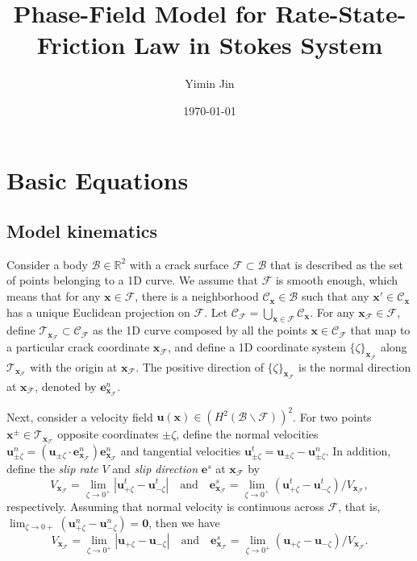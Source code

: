 \documentclass{article}
\begin{document}
  \title{Phase-Field Model for Rate-State-Friction Law in Stokes System}
  \author{Yimin Jin}
  \date{\small\today}
  \maketitle

\section{Basic Equations}\label{sect:basic equations}

\subsection{Model kinematics}\label{sect:kinematics}

Consider a body $\mathcal B\in\mathbb R^2$ with a crack surface $\mathcal F\subset\mathcal B$ that is described as the set of points belonging to a 1D curve. We assume that $\mathcal F$ is smooth enough, which means that for any $\bm x\in\mathcal F$, there is a neighborhood $\mathcal C_{\bm x}\in\mathcal B$ such that any $\bm x'\in\mathcal C_{\bm x}$ has a unique Euclidean projection on $\mathcal F$. Let $\mathcal C_{\mathcal F} = \bigcup_{\bm x\in\mathcal F}\mathcal C_{\bm x}$. For any $\bm x_{\mathcal F}\in\mathcal F$, define $\mathcal T_{\bm x_\mathcal F}\subset\mathcal C_{\mathcal F}$ as the 1D curve composed by all the points $\bm x\in\mathcal C_{\mathcal F}$ that map to a particular crack coordinate $\bm x_\mathcal F$, and define a 1D coordinate system $\{\zeta\}_{\bm x_\mathcal F}$ along $\mathcal T_{\bm x_\mathcal F}$ with the origin at $\bm x_\mathcal F$. The positive direction of $\{\zeta\}_{\bm x_\mathcal F}$ is the normal direction at $\bm x_\mathcal F$, denoted by $\bm e^n_{\bm x_\mathcal F}$.

Next, consider a velocity field ${\bm u}(\bm x)\in\left(H^2(\mathcal B\backslash\mathcal F)\right)^2$. For two points $\bm x^\pm\in\mathcal T_{\bm x_\mathcal F}$ opposite coordinates $\pm\zeta$, define the normal velocities ${\bm u}_{\pm\zeta}^n = ({\bm u}_{\pm\zeta}\cdot\bm e^n_{\bm x_\mathcal F})\bm e^n_{\bm x_\mathcal F}$ and tangential velocities ${\bm u}_{\pm\zeta}^t = {\bm u}_{\pm\zeta} - {\bm u}_{\pm\zeta}^n$. In addition, define the \textit{slip rate} $V$ and \textit{slip direction} $\bm e^s$ at $\bm x_\mathcal F$ by
\begin{equation}
  V_{\bm x_\mathcal F} = \lim_{\zeta\to 0^+}\left|{\bm u}_{+\zeta}^t - {\bm u}_{-\zeta}^t\right|\quad\text{and}\quad
  \bm e^s_{\bm x_\mathcal F} = \lim_{\zeta\to 0^+}\left({\bm u}_{+\zeta}^t - {\bm u}_{-\zeta}^t\right)/V_{\bm x_\mathcal F},
\end{equation}
respectively. Assuming that normal velocity is continuous across $\mathcal F$, that is, $\displaystyle\lim_{\zeta\to 0+}({\bm u}_{+\zeta}^n - {\bm u}_{-\zeta}^n) = \bm 0$, then we have
\begin{equation}\label{eq:V and s}
  V_{\bm x_\mathcal F} = \lim_{\zeta\to 0^+}\left|{\bm u}_{+\zeta} - {\bm u}_{-\zeta}\right|\quad\text{and}\quad
  \bm e^s_{\bm x_\mathcal F} = \lim_{\zeta\to 0^+}\left({\bm u}_{+\zeta} - {\bm u}_{-\zeta}\right)/V_{\bm x_\mathcal F}.
\end{equation}
\end{document}
